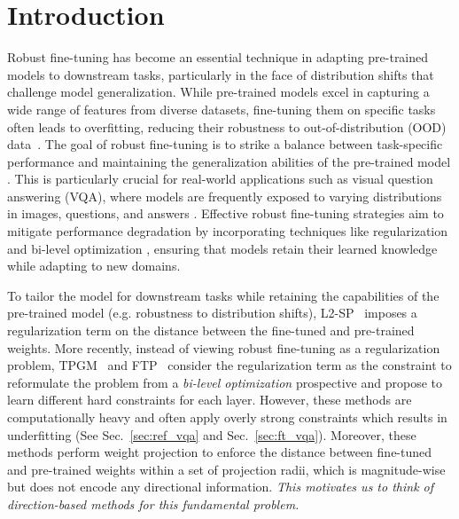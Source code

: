 \section{Introduction}
Robust fine-tuning has become an essential technique in adapting pre-trained models to downstream tasks, particularly in the face of distribution shifts that challenge model generalization. While pre-trained models excel in capturing a wide range of features from diverse datasets, fine-tuning them on specific tasks often leads to overfitting, reducing their robustness to out-of-distribution (OOD) data~\citep{wortsman_robust_2022, nguyen_saft_2024}. The goal of robust fine-tuning is to strike a balance between task-specific performance and maintaining the generalization abilities of the pre-trained model \citep{wortsman_robust_2022}. This is particularly crucial for real-world applications such as visual question answering (VQA), where models are frequently exposed to varying distributions in images, questions, and answers \citep{agrawal_dont_2018, shah_cycle-consistency_2019}. Effective robust fine-tuning strategies aim to mitigate performance degradation by incorporating techniques like regularization~\citep{li_explicit_2018} and bi-level optimization \citep{tian_trainable_2023, tian_fast_2023,tian2024rethinkingweightdecayrobust}, ensuring that models retain their learned knowledge while adapting to new domains.

To tailor the model for downstream tasks while retaining the capabilities of the pre-trained model (e.g. robustness to distribution shifts), L2-SP~\citep{li_explicit_2018} imposes a regularization term on the distance between the fine-tuned and pre-trained weights. More recently, instead of viewing robust fine-tuning as a regularization problem, TPGM~\citep{tian_trainable_2023} and FTP~\citep{tian_fast_2023} consider the regularization term as the constraint to reformulate the problem from a \textit{bi-level optimization} prospective and propose to learn different hard constraints for each layer. However, these methods are computationally heavy and often apply overly strong constraints which results in underfitting (See Sec.~\ref{sec:ref_vqa} and Sec.~\ref{sec:ft_vqa}). Moreover, these methods perform weight projection to enforce the distance between fine-tuned and pre-trained weights within a set of projection radii, which is magnitude-wise but does not encode any directional information. \textit{This motivates us to think of direction-based methods for this fundamental problem.}

